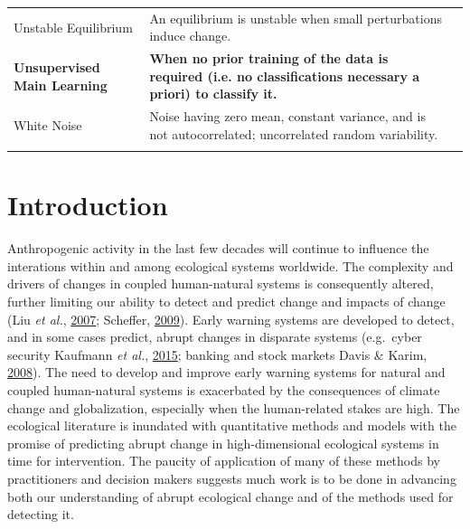\documentclass[12pt,twoside,openany]{reedthesis}
\begin{document}
\begin{landscape}
\begin{longtable}{>{\raggedright\arraybackslash}p{12em}>{\raggedright\arraybackslash}p{35em}>{\raggedright\arraybackslash}p{8em}}
Unstable Equilibrium & An equilibrium is unstable when small perturbations induce change. & \\
\textbf{Unsupervised Main Learning} & \textbf{When no prior training of the data is required (i.e. no classifications necessary a priori) to classify it.} & \textbf{}\\
White Noise & Noise having zero mean, constant variance, and is not autocorrelated; uncorrelated random variability. & \\*
\end{longtable}
\endgroup{}
\end{landscape}
\hypertarget{intro}{%
\chapter{Introduction}\label{intro}}

Anthropogenic activity in the last few decades will continue to influence the interations within and among ecological systems worldwide. The complexity and drivers of changes in coupled human-natural systems is consequently altered, further limiting our ability to detect and predict change and impacts of change (Liu \emph{et al.}, \protect\hyperlink{ref-liu_complexity_2007}{2007}; Scheffer, \protect\hyperlink{ref-scheffer_critical_2009}{2009}). Early warning systems are developed to detect, and in some cases predict, abrupt changes in disparate systems (e.g.~cyber security Kaufmann \emph{et al.}, \protect\hyperlink{ref-kaufmann2015structural}{2015}; banking and stock markets Davis \& Karim, \protect\hyperlink{ref-davis_comparing_2008}{2008}). The need to develop and improve early warning systems for natural and coupled human-natural systems is exacerbated by the consequences of climate change and globalization, especially when the human-related stakes are high. The ecological literature is inundated with quantitative methods and models with the promise of predicting abrupt change in high-dimensional ecological systems in time for intervention. The paucity of application of many of these methods by practitioners and decision makers suggests much work is to be done in advancing both our understanding of abrupt ecological change and of the methods used for detecting it.
\end{document}
